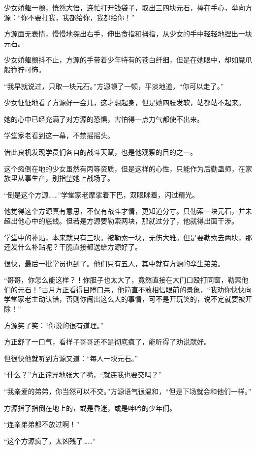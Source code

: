 \begin{this_body}
少女娇躯一颤，恍然大悟，连忙打开钱袋子，取出三四块元石，捧在手心，举向方源：“你不要打我，我都给你，我都给你！”

方源面无表情，慢慢地探出右手，伸出食指和拇指，从少女的手中轻轻地捏出一块元石。

少女娇躯颤抖不止，方源的手带着少年特有的苍白纤细，但是在她眼中，却如魔爪般狰狞可怖。

“我早就说过，只取一块元石。”方源顿了一顿，平淡地道，“你可以走了。”

少女怔怔地看了方源好一会儿，这才想起身，但是她四肢发软，站都站不起来。

她的心中已经充满了对方源的恐惧，害怕得一点力气都使不出来。

学堂家老看到这一幕，不禁摇摇头。

借此良机发现学员们各自的战斗天赋，也是他观察的目的之一。

这个瘫倒在地的少女虽然有丙等资质，但是这样的心性，只能作为后勤蛊师，在家族里从事生产，别指望她上战场了。

“倒是这个方源……”学堂家老摩挲着下巴，双眼眯着，闪过精光。

他觉得这个方源真有意思，不仅有战斗才情，更知道分寸。只勒索一块元石，并未超出他心中的底线。但若是方源要勒索两块，那就过分了，他就得出面干涉。

学堂中的补贴，本来就只有三块。被勒索一块，无伤大雅。但是要勒索去两块，那还发什么补贴呢？干脆直接都送给方源好了。

很快，最后一批学员也到了。他们只有五人，其中就有方源的孪生弟弟。

“哥哥，你怎么能这样？！你胆子也太大了，竟然直接在大门口殴打同窗，勒索他们的元石！”古月方正看得目瞪口呆，他简直不敢相信眼前的景象，“我劝你快快向学堂家老主动认错，否则你闹出这么大的事情，可不是开玩笑的，说不定就要被开除！”

方源笑了笑：“你说的很有道理。”

方正舒了一口气，看样子哥哥还不是彻底疯了，能听得了劝说就好。

但很快他就听到方源又道：“每人一块元石。”

“什么？”方正诧异地张大了嘴，“就连我也要交吗？”

“我亲爱的弟弟，你当然可以不交。”方源语气很温和，“但是下场就会和他们一样。”

方源指了指倒在地上的，或是昏迷，或是呻吟的少年们。

“连亲弟弟都不放过啊！”

“这个方源疯了，太凶残了……”


\end{this_body}
